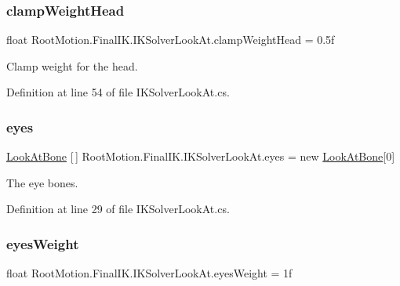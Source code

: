 \subsubsection{\texorpdfstring{clamp\+Weight\+Head}{clampWeightHead}}
{\footnotesize\ttfamily float Root\+Motion.\+Final\+I\+K.\+I\+K\+Solver\+Look\+At.\+clamp\+Weight\+Head = 0.\+5f}



Clamp weight for the head. 



Definition at line 54 of file I\+K\+Solver\+Look\+At.\+cs.

\mbox{\label{class_root_motion_1_1_final_i_k_1_1_i_k_solver_look_at_a04b9336c41f6eccfba6c0ab8066ccaca}} 
\subsubsection{\texorpdfstring{eyes}{eyes}}
{\footnotesize\ttfamily \mbox{\hyperlink{class_root_motion_1_1_final_i_k_1_1_i_k_solver_look_at_1_1_look_at_bone}{Look\+At\+Bone}} \mbox{[}$\,$\mbox{]} Root\+Motion.\+Final\+I\+K.\+I\+K\+Solver\+Look\+At.\+eyes = new \mbox{\hyperlink{class_root_motion_1_1_final_i_k_1_1_i_k_solver_look_at_1_1_look_at_bone}{Look\+At\+Bone}}\mbox{[}0\mbox{]}}



The eye bones. 



Definition at line 29 of file I\+K\+Solver\+Look\+At.\+cs.

\mbox{\label{class_root_motion_1_1_final_i_k_1_1_i_k_solver_look_at_a8ba8c5444746a73418df26ed95bc354e}} 
\subsubsection{\texorpdfstring{eyes\+Weight}{eyesWeight}}
{\footnotesize\ttfamily float Root\+Motion.\+Final\+I\+K.\+I\+K\+Solver\+Look\+At.\+eyes\+Weight = 1f}




